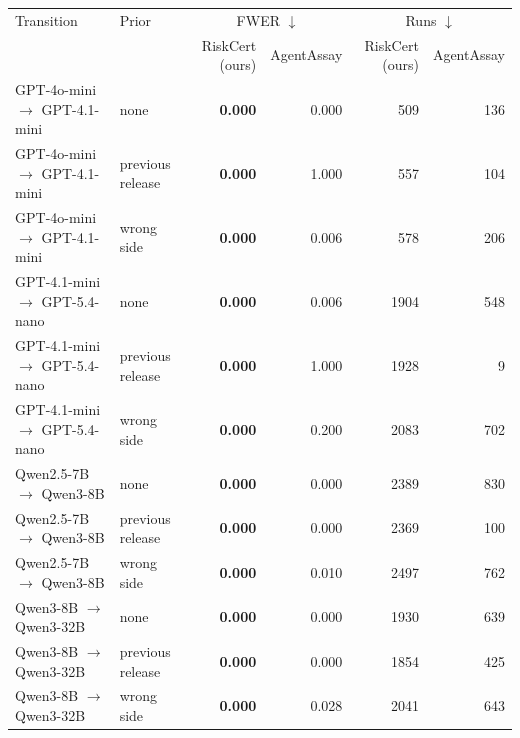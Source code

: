 \begin{tabular}{llrrrr}
\toprule
Transition & Prior & \multicolumn{2}{c}{FWER $\downarrow$} & \multicolumn{2}{c}{Runs $\downarrow$} \\
 & & RiskCert (ours) & AgentAssay & RiskCert (ours) & AgentAssay \\
\midrule
GPT-4o-mini $\to$ GPT-4.1-mini & none & \textbf{0.000} & 0.000 & 509 & 136 \\
GPT-4o-mini $\to$ GPT-4.1-mini & previous release & \textbf{0.000} & 1.000 & 557 & 104 \\
GPT-4o-mini $\to$ GPT-4.1-mini & wrong side & \textbf{0.000} & 0.006 & 578 & 206 \\
GPT-4.1-mini $\to$ GPT-5.4-nano & none & \textbf{0.000} & 0.006 & 1904 & 548 \\
GPT-4.1-mini $\to$ GPT-5.4-nano & previous release & \textbf{0.000} & 1.000 & 1928 & 9 \\
GPT-4.1-mini $\to$ GPT-5.4-nano & wrong side & \textbf{0.000} & 0.200 & 2083 & 702 \\
Qwen2.5-7B $\to$ Qwen3-8B & none & \textbf{0.000} & 0.000 & 2389 & 830 \\
Qwen2.5-7B $\to$ Qwen3-8B & previous release & \textbf{0.000} & 0.000 & 2369 & 100 \\
Qwen2.5-7B $\to$ Qwen3-8B & wrong side & \textbf{0.000} & 0.010 & 2497 & 762 \\
Qwen3-8B $\to$ Qwen3-32B & none & \textbf{0.000} & 0.000 & 1930 & 639 \\
Qwen3-8B $\to$ Qwen3-32B & previous release & \textbf{0.000} & 0.000 & 1854 & 425 \\
Qwen3-8B $\to$ Qwen3-32B & wrong side & \textbf{0.000} & 0.028 & 2041 & 643 \\
\bottomrule
\end{tabular}
